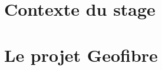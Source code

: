 \documentclass[a4paper, 12pt, onecolumn, openright, oneside]{report}
\begin{document}
  
  
  \tableofcontents
  
  \part{Contexte du stage}
  
  
  
  \part{Le projet Geofibre}
  
  
  
  
  
  \appendix
  
  
\end{document}
